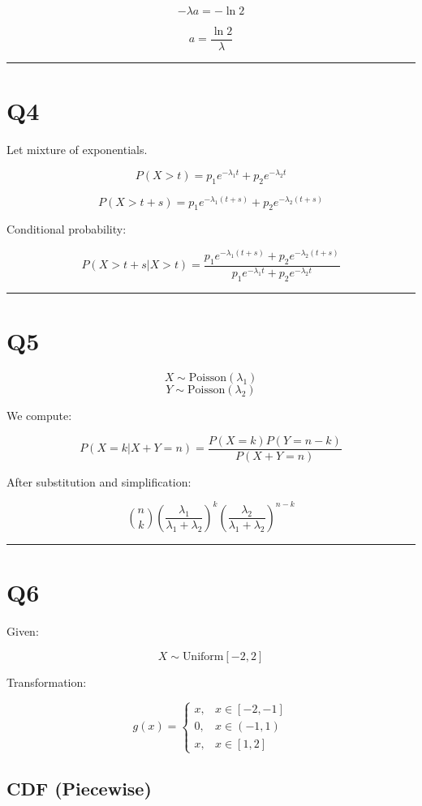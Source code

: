 \documentclass[12pt]{article}
\begin{document}
\[
-\lambda a = -\ln 2
\]

\[
a = \frac{\ln 2}{\lambda}
\]

\hrule
\vspace{0.5cm}

\section*{Q4}

Let mixture of exponentials.

\[
P(X>t) = p_1 e^{-\lambda_1 t} + p_2 e^{-\lambda_2 t}
\]

\[
P(X>t+s)
=
p_1 e^{-\lambda_1(t+s)}
+
p_2 e^{-\lambda_2(t+s)}
\]

Conditional probability:

\[
P(X>t+s|X>t)
=
\frac{
p_1 e^{-\lambda_1(t+s)} + p_2 e^{-\lambda_2(t+s)}
}{
p_1 e^{-\lambda_1 t} + p_2 e^{-\lambda_2 t}
}
\]

\hrule
\vspace{0.5cm}

\section*{Q5}

\[
X \sim \text{Poisson}(\lambda_1)
\]
\[
Y \sim \text{Poisson}(\lambda_2)
\]

We compute:

\[
P(X=k|X+Y=n)
=
\frac{P(X=k)P(Y=n-k)}{P(X+Y=n)}
\]

After substitution and simplification:

\[
\binom{n}{k}
\left(\frac{\lambda_1}{\lambda_1+\lambda_2}\right)^k
\left(\frac{\lambda_2}{\lambda_1+\lambda_2}\right)^{n-k}
\]

\hrule
\vspace{0.5cm}

\section*{Q6}

Given:

\[
X \sim \text{Uniform}[-2,2]
\]

Transformation:

\[
g(x)=
\begin{cases}
x, & x\in[-2,-1] \\
0, & x\in(-1,1) \\
x, & x\in[1,2]
\end{cases}
\]

\subsection*{CDF (Piecewise)}
\end{document}
